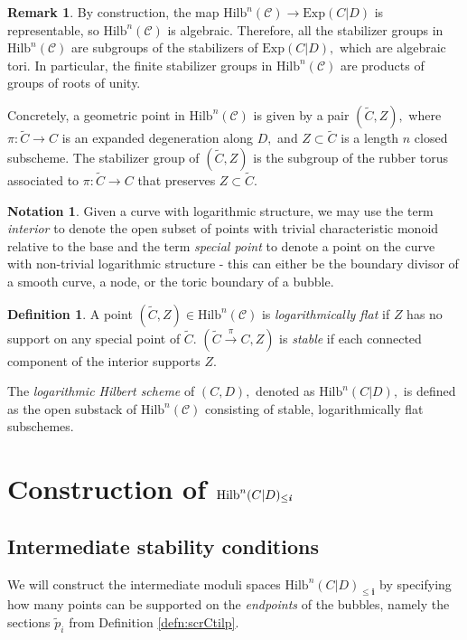 \documentclass[10.5pt]{amsart}
\theoremstyle{definition}
\theoremstyle{definition}
\theoremstyle{definition}
\theoremstyle{definition}
\newtheorem{remark}[theorem]{Remark}
\newtheorem{definition}[theorem]{Definition}
\newtheorem{notation}[theorem]{Notation}
\newcommand{\Hilb}{\mathrm{Hilb}}
\newcommand{\bi}{\boldsymbol{i}}
\begin{document}
\begin{remark}
    By construction, the map $\mathrm{Hilb}^n(\mathscr{C})\to \mathrm{Exp}(C|D)$ is representable, so $\mathrm{Hilb}^n(\mathscr{C})$ is algebraic. Therefore, all the stabilizer groups in $\mathrm{Hilb}^n(\mathscr{C})$ are subgroups of the stabilizers of $\mathrm{Exp}(C|D),$ which are algebraic tori. In particular, the finite stabilizer groups in $\mathrm{Hilb}^n(\mathscr{C})$ are products of groups of roots of unity.
\end{remark}
    

Concretely, a geometric point in $\mathrm{Hilb}^n(\mathscr{C})$ is given by a pair $(\tilde{C},Z),$ where $\pi: \tilde{C}\to C$ is an expanded degeneration along $D,$ and $Z\subset \tilde{C}$ is a length $n$ closed subscheme. The stabilizer group of $(\tilde{C},Z)$ is the subgroup of the rubber torus associated to $\pi: \tilde{C}\to C$ that preserves $Z\subset\tilde{C}.$ 

\begin{notation}
    Given a curve with logarithmic structure, we may use the term \emph{interior} to denote the open subset of points with trivial characteristic monoid relative to the base and the term \emph{special point} to denote a point on the curve with non-trivial logarithmic structure - this can either be the boundary divisor of a smooth curve, a node, or the toric boundary of a bubble.
\end{notation}

\begin{definition}
  A point $(\tilde{C},Z)\in \mathrm{Hilb}^n(\mathscr{C})$ is \textit{logarithmically flat} if $Z$ has no support on any special point of $\tilde{C}$. $(\tilde{C}\xrightarrow{\pi} C,Z)$ is \textit{stable} if each connected component of the interior supports $Z$.

  The \emph{logarithmic Hilbert scheme} of $(C,D),$ denoted as $\Hilb^n(C|D),$ is defined as the open substack of $\mathrm{Hilb}^n(\mathscr{C})$ consisting of stable, logarithmically flat subschemes.
\end{definition}

\section{Construction of $\Hilb^n(C|D)_{\le {\text{\textbf{\textit{i}}}}}$}\label{sec:interm}

\subsection{Intermediate stability conditions} We will construct the intermediate moduli spaces $\Hilb^n(C|D)_{\le \bi}$ by specifying how many points can be supported on the \textit{endpoints} of the bubbles, namely the sections $\tilde{p}_i$ from Definition \ref{defn:scrCtilp}.  
\end{document}
